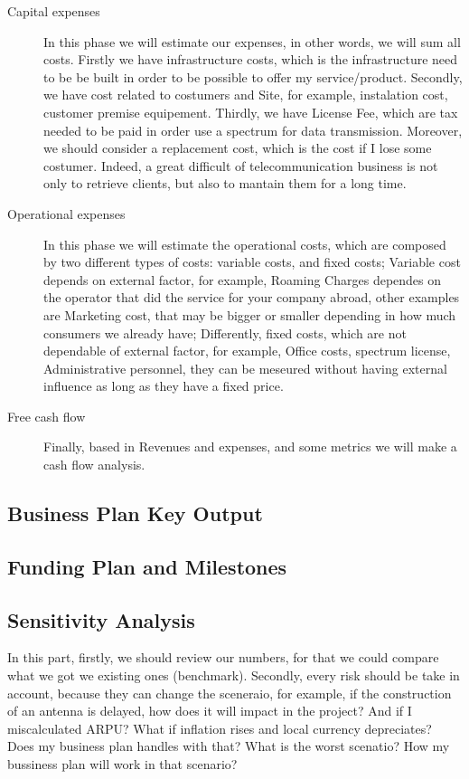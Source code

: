 \documentclass[a4paper,11pt]{article}
\begin{document}
\begin{description}
\item[Capital expenses]  In this phase we  will estimate our  expenses, in other
  words, we  will sum all  costs. Firstly we  have {\color{purple}infrastructure
    costs},  which is the  infrastructure need  to be  be built  in order  to be
  possible  to offer  my  service/product.  Secondly, we  have  cost related  to
  costumers  and   Site,  for   example,  instalation  cost,   customer  premise
  equipement. Thirdly, we  have License Fee, which are tax needed  to be paid in
  order use  a spectrum  for data transmission.  Moreover, we should  consider a
  replacement cost, which  is the cost if I lose some  costumer. Indeed, a great
  difficult of telecommunication  business is not only to  retrieve clients, but
  also to mantain them for a long time.
\item[Operational  expenses] In  this  phase we  will  estimate the  operational
  costs, which are composed by two different types of costs: variable costs, and
  fixed costs;
  Variable  cost  depends  on  external  factor, for  example,  Roaming  Charges
  dependes on the  operator that did the service for  your company abroad, other
  examples are  Marketing cost, that may  be bigger or smaller  depending in how
  much consumers we already have;
  Differently, fixed costs, which are not dependable of external factor, for example, Office costs, spectrum license,
  Administrative  personnel,  they  can  be  meseured  without  having  external
  influence as long as they have a fixed price.


\item[Free cash flow] Finally, based  in Revenues and expenses, and some metrics
  we will make a cash flow analysis.
\end{description}

\subsection{Business Plan Key Output}
\subsection{Funding Plan and Milestones}
\subsection{Sensitivity Analysis}
In this part, firstly, we should review our numbers, for that we could compare what we
got we existing ones (benchmark). Secondly, every risk should be take in account,
because they  can change the sceneraio,  for example, if the  construction of an
antenna  is  delayed,  how  does  it  will  impact in  the  project?  And  if  I
miscalculated ARPU? What if inflation rises and local currency depreciates? Does
my business plan handles with that?
What is the worst scenatio? How my bussiness plan will work in that scenario?
\end{document}

